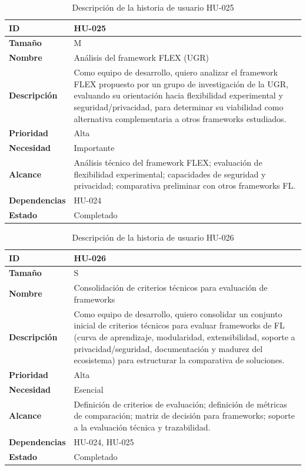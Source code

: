 \documentclass{report}
\begin{document}
\begin{table}[H]
\centering
\caption{Descripción de la historia de usuario HU-025}
\label{tab:hu025}
\begin{tabular}{|l|p{12cm}|}
\hline
\textbf{ID} & HU-025 \\ \hline
\textbf{Tamaño} & M \\ \hline
\textbf{Nombre} & Análisis del framework FLEX (UGR) \\ \hline
\textbf{Descripción} &
Como equipo de desarrollo, quiero analizar el framework FLEX propuesto por un grupo de investigación de la UGR, evaluando su orientación hacia flexibilidad experimental y seguridad/privacidad, para determinar su viabilidad como alternativa complementaria a otros frameworks estudiados. \\ \hline
\textbf{Prioridad} & Alta \\ \hline
\textbf{Necesidad} & Importante \\ \hline
\textbf{Alcance} &
Análisis técnico del framework FLEX; evaluación de flexibilidad experimental; capacidades de seguridad y privacidad; comparativa preliminar con otros frameworks FL. \\ \hline
\textbf{Dependencias} & HU-024 \\ \hline
\textbf{Estado} & Completado \\ \hline
\end{tabular}
\end{table}



\begin{table}[H]
\centering
\caption{Descripción de la historia de usuario HU-026}
\label{tab:hu026}
\begin{tabular}{|l|p{12cm}|}
\hline
\textbf{ID} & HU-026 \\ \hline
\textbf{Tamaño} & S \\ \hline
\textbf{Nombre} & Consolidación de criterios técnicos para evaluación de frameworks \\ \hline
\textbf{Descripción} &
Como equipo de desarrollo, quiero consolidar un conjunto inicial de criterios técnicos para evaluar frameworks de FL (curva de aprendizaje, modularidad, extensibilidad, soporte a privacidad/seguridad, documentación y madurez del ecosistema) para estructurar la comparativa de soluciones. \\ \hline
\textbf{Prioridad} & Alta \\ \hline
\textbf{Necesidad} & Esencial \\ \hline
\textbf{Alcance} &
Definición de criterios de evaluación; definición de métricas de comparación; matriz de decisión para frameworks; soporte a la evaluación técnica y trazabilidad. \\ \hline
\textbf{Dependencias} & HU-024, HU-025 \\ \hline
\textbf{Estado} & Completado \\ \hline
\end{tabular}
\end{table}
\end{document}
